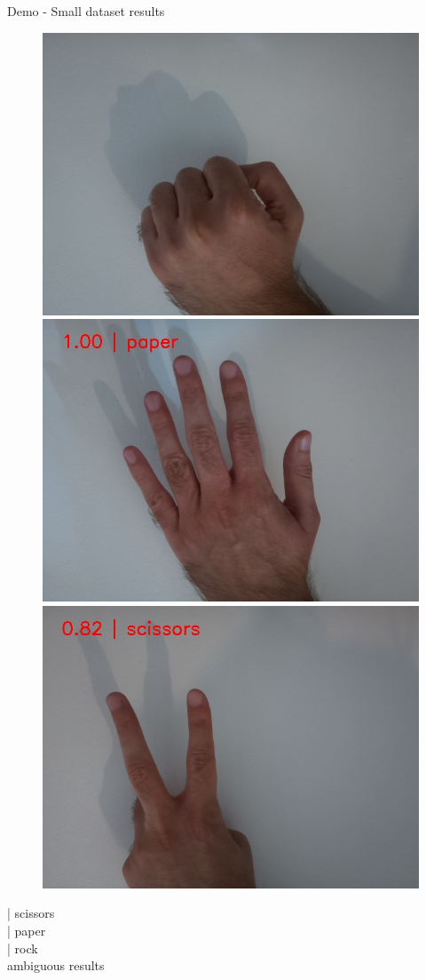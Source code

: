 \begin{frame}{Demo - Small dataset results}
  \begin{figure}
	\includegraphics[width=0.33\linewidth,height=0.5\textheight,keepaspectratio]{images/rock_small_dataset_output.jpeg}%
	\includegraphics[width=0.33\linewidth,height=0.5\textheight,keepaspectratio]{images/paper_small_dataset_output.jpeg}%
	\includegraphics[width=0.33\linewidth,height=0.5\textheight,keepaspectratio]{images/scissors_small_dataset_output.jpeg}
  \end{figure}
   | scissors \\
   | paper \\
   | rock \\
  \ttfamily ambiguous results
\end{frame}

